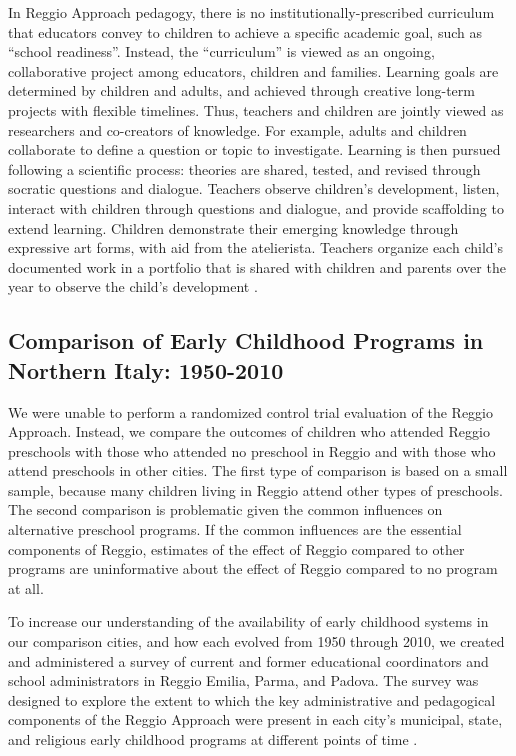 In Reggio Approach pedagogy, there is no institutionally-prescribed curriculum that educators convey to children to achieve a specific academic goal, such as ``school readiness''. Instead, the ``curriculum'' is viewed as an ongoing, collaborative project among educators, children and families. Learning goals are determined by children and adults, and achieved through creative long-term projects with flexible timelines. Thus, teachers and children are jointly viewed as researchers and co-creators of knowledge. For example, adults and children collaborate to define a question or topic to investigate. Learning is then pursued following a scientific process: theories are shared, tested, and revised through socratic questions and dialogue. Teachers observe children's development, listen, interact with children through questions and dialogue, and provide scaffolding to extend learning. Children demonstrate their emerging knowledge through expressive art forms, with aid from the atelierista. Teachers organize each child's documented work in a portfolio that is shared with children and parents over the year to observe the child's development \citep{Rinaldi_2006_ReggioEmilia_BOOK,Giudici-Nicolosi_2014_Reggio-Approach}.

\subsection{Comparison of Early Childhood Programs in Northern Italy: 1950-2010}

We were unable to perform a randomized control trial evaluation of the Reggio Approach. Instead, we compare the outcomes of children who attended Reggio preschools with those who attended no preschool in Reggio and with those who attend preschools in other cities. The first type of comparison is based on a small sample, because many children living in Reggio attend other types of preschools. The second comparison is problematic given the common influences on alternative preschool programs. If the common influences are the essential components of Reggio, estimates of the effect of Reggio compared to other programs are uninformative about the effect of Reggio compared to no program at all.

To increase our understanding of the availability of early childhood systems in our comparison cities, and how each evolved from 1950 through 2010, we created and administered a survey of current and former educational coordinators and school administrators in Reggio Emilia, Parma, and Padova. The survey was designed to explore the extent to which the key administrative and pedagogical components of the Reggio Approach were present in each city's municipal, state, and religious early childhood programs at different points of time \citep{CEHD_2016_Historical-Analysis}.

